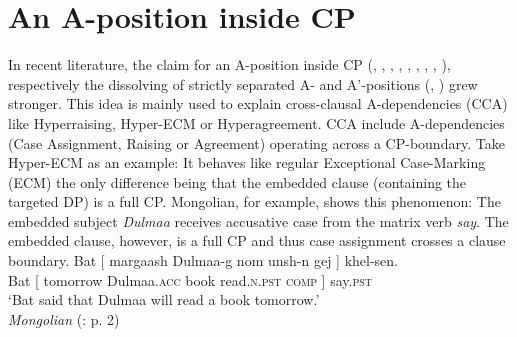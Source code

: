 \documentclass[output=paper,colorlinks,citecolor=brown]{langscibook}
\begin{document}
\section{An A-position inside CP}
In recent literature, the claim for an A-position inside CP (\citealp{tanaka2002raising}, \citealp{csener2008non}, \citealp{takeuchi2010exceptional}, \citealp{alboiu2011case}, \citealp{bondarenko2017ecm}, \citealp{zyman2017p}, \citealp{zyman2018rich}, \citealp{wurmbrand2018cross},  \citealp{fong2019proper}), respectively the dissolving of strictly separated A- and A'-positions (\citealp{obata2011feature}, \citealp{vanUrk2015}) grew stronger. This idea is mainly used to explain cross-clausal A-dependencies (CCA) like Hyperraising, Hyper-ECM or Hyperagreement. CCA include A-dependencies (Case Assignment, Raising or Agreement) operating across a CP-boundary. Take Hyper-ECM as an example: It behaves like regular Exceptional Case-Marking (ECM) the only difference being that the embedded clause (containing the targeted DP) is a full CP. Mongolian, for example, shows this phenomenon: The embedded subject \emph{Dulmaa} receives accusative case from the matrix verb \emph{say}. The embedded clause, however, is a full CP and thus case assignment crosses a clause boundary.
\ea 
\gll Bat [ margaash Dulmaa-g nom unsh-n gej ] khel-sen.\\
Bat [ tomorrow Dulmaa.\textsc{acc} book read.\textsc{n.pst} \textsc{comp} ] say.\textsc{pst}\\
\glt `Bat said that Dulmaa will read a book tomorrow.'\\
\emph{Mongolian} (\citealp{fong2019proper}: p. 2)
\z
\end{document}
